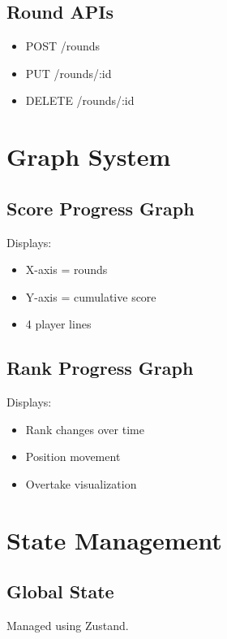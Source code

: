 \documentclass[11pt,a4paper]{article}
\begin{document}
\subsection{Round APIs}

\begin{itemize}
    \item POST /rounds
    \item PUT /rounds/:id
    \item DELETE /rounds/:id
\end{itemize}

\section{Graph System}

\subsection{Score Progress Graph}

Displays:
\begin{itemize}
    \item X-axis = rounds
    \item Y-axis = cumulative score
    \item 4 player lines
\end{itemize}

\subsection{Rank Progress Graph}

Displays:
\begin{itemize}
    \item Rank changes over time
    \item Position movement
    \item Overtake visualization
\end{itemize}

\section{State Management}

\subsection{Global State}

Managed using Zustand.
\end{document}
